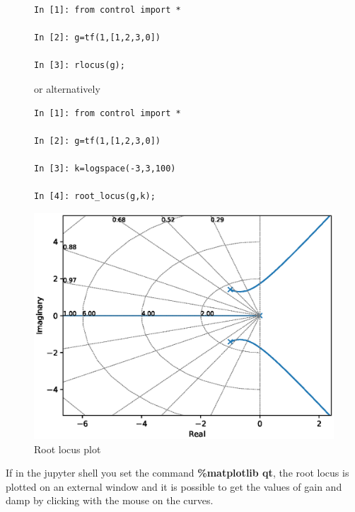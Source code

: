\begin{figure}[htbp]
\begin{minipage}[t]{0.55\textwidth}
  \vspace{0pt}
\begin{lstlisting}[linewidth=7cm,xleftmargin=0cm]
In [1]: from control import *

In [2]: g=tf(1,[1,2,3,0])

In [3]: rlocus(g);
\end{lstlisting}

or alternatively

\begin{lstlisting}[linewidth=7cm,xleftmargin=0cm]
In [1]: from control import *

In [2]: g=tf(1,[1,2,3,0])

In [3]: k=logspace(-3,3,100)

In [4]: root_locus(g,k);
\end{lstlisting}

\end{minipage}%
\begin{minipage}[t]{0.5\textwidth}
  \vspace{0pt} \centering
  \includegraphics[width=\textwidth]{eps/rlocus.eps}
\end{minipage}
\caption{Root locus plot}
\label{F9}
\end{figure}

If in the jupyter shell you set the command \textbf{\%matplotlib qt}, the root 
locus is plotted on an external window and it is possible to get the values of 
gain and damp by clicking with the mouse on the curves.

